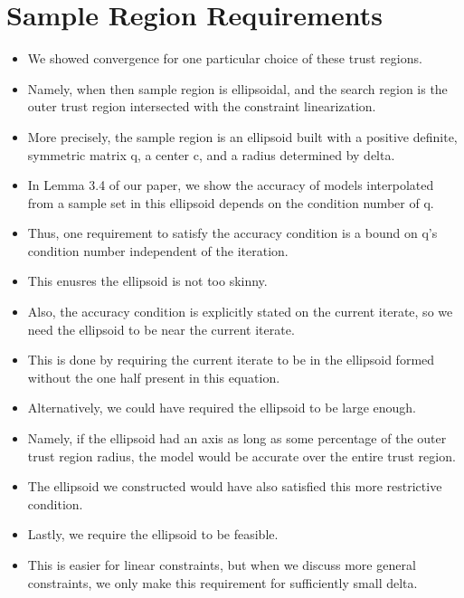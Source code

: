 \documentclass{article}
\begin{document}
	\section{Sample Region Requirements}
\begin{itemize}
\item We showed convergence for one particular choice of these trust regions.
\item Namely, when then sample region is ellipsoidal,  and the search region is the outer trust region intersected with the constraint linearization.
\item More precisely, the sample region is an ellipsoid built with a positive definite, symmetric matrix q, a center c, and a radius determined by delta.
\item In Lemma 3.4 of our paper, we show the accuracy of models interpolated from a sample set in this ellipsoid depends on the condition number of q.
\item Thus, one requirement to satisfy the accuracy condition is a bound on q's condition number independent of the iteration.
\item This enusres the ellipsoid is not too skinny.
\item Also, the accuracy condition is explicitly stated on the current iterate, so we need the ellipsoid to be near the current iterate.
\item This is done by requiring the current iterate to be in the ellipsoid formed without the one half present in this equation.
\item Alternatively, we could have required the ellipsoid to be large enough.
\item Namely, if the ellipsoid had an axis as long as some percentage of the outer trust region radius, the model would be accurate over the entire trust region.
\item The ellipsoid we constructed would have also satisfied this more restrictive condition.
\item Lastly, we require the ellipsoid to be feasible.
\item This is easier for linear constraints, but when we discuss more general constraints, we only make this requirement for sufficiently small delta.
\end{itemize}
\end{document}
